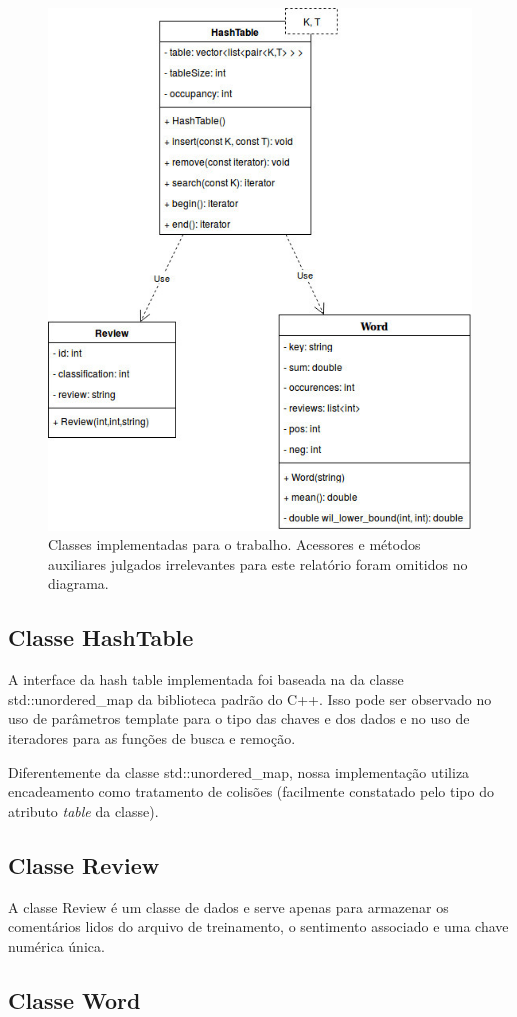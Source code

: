 \documentclass[12pt]{article}
\begin{document}
\begin{figure}[ht]
\centering
\includegraphics[width=.5\textwidth]{class_diagram.jpg}
\caption{Classes implementadas para o trabalho. Acessores e métodos auxiliares julgados irrelevantes
  para este relatório foram omitidos no diagrama.}
\label{fig:class_diagram}
\end{figure}

\subsection{Classe HashTable}

A interface da hash table implementada foi baseada na da classe std::unordered\_map da biblioteca padrão 
do C++. Isso pode ser observado no uso de parâmetros template para o tipo das chaves e dos dados e no 
uso de iteradores para as funções de busca e remoção.

Diferentemente da classe std::unordered\_map, nossa implementação utiliza encadeamento como tratamento de 
colisões (facilmente constatado pelo tipo do atributo \emph{table} da classe).



\subsection{Classe Review}

A classe Review é um classe de dados e serve apenas para armazenar os comentários lidos do arquivo de 
treinamento, o sentimento associado e uma chave numérica única.

\subsection{Classe Word}
\end{document}
